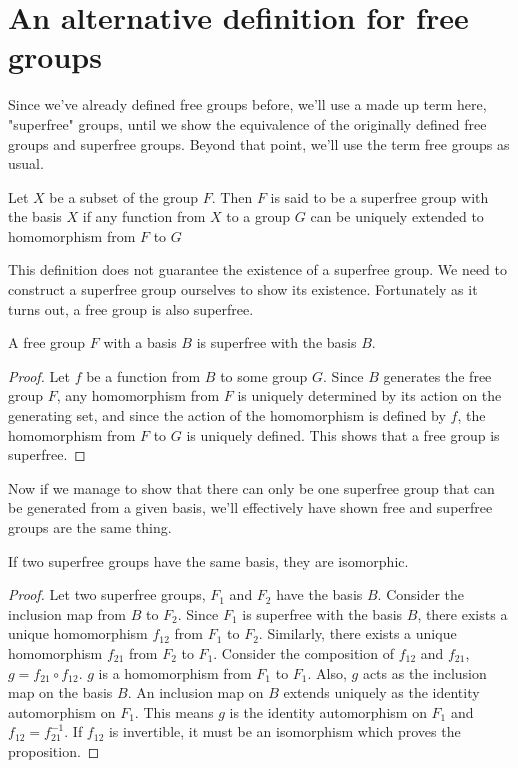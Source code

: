 \section{An alternative definition for free groups}

Since we've already defined free groups before, we'll use a made up term here, "superfree" groups, until we show the equivalence of the originally defined free groups and superfree groups. Beyond that point, we'll use the term free groups as usual.

\begin{defn}\cite{lyndon}
Let $X$ be a subset of the group $F$. Then $F$ is said to be a superfree group with the basis $X$ if any function from $X$ to a group $G$ can be uniquely extended to homomorphism from $F$ to $G$
\end{defn}

This definition does not guarantee the existence of a superfree group. We need to construct a superfree group ourselves to show its existence. Fortunately as it turns out, a free group is also superfree.

\begin{prop}
A free group $F$ with a basis $B$ is superfree with the basis $B$.
\end{prop}

\begin{proof}
Let $f$ be a function from $B$ to some group $G$. Since $B$ generates the free group $F$, any homomorphism from $F$ is uniquely determined by its action on the generating set, and since the action of the homomorphism is defined by $f$, the homomorphism from $F$ to $G$ is uniquely defined. This shows that a free group is superfree.
\end{proof}

Now if we manage to show that there can only be one superfree group that can be generated from a given basis, we'll effectively have shown free and superfree groups are the same thing.

\begin{prop}\label{univ}
If two superfree groups have the same basis, they are isomorphic.
\end{prop}

\begin{proof}
Let two superfree groups, $F_1$ and $F_2$ have the basis $B$. Consider the inclusion map from $B$ to $F_2$. Since $F_1$ is superfree with the basis $B$, there exists a unique homomorphism $f_{12}$ from $F_1$ to $F_2$. Similarly, there exists a unique homomorphism $f_{21}$ from $F_2$ to $F_1$. Consider the composition of $f_{12}$ and $f_{21}$, $g = f_{21} \circ f_{12}$. $g$ is a homomorphism from $F_1$ to $F_1$. Also, $g$ acts as the inclusion map on the basis $B$. An inclusion map on $B$ extends uniquely as the identity automorphism on $F_1$. This means $g$ is the identity automorphism on $F_1$ and $f_{12} = f_{21}^{-1}$. If $f_{12}$ is invertible, it must be an isomorphism which proves the proposition.
\end{proof}

